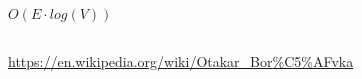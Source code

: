 \documentclass{beamer}
\begin{document}
\begin{frame}
\begin{columns}
\begin{column}{0.7\linewidth}
\begin{center}
$O(E \cdot log(V))$
\end{center}
\end{column}
\end{columns}
{\tiny \url{https://en.wikipedia.org/wiki/Otakar_Bor\%C5\%AFvka}}

\end{frame}
\end{document}
